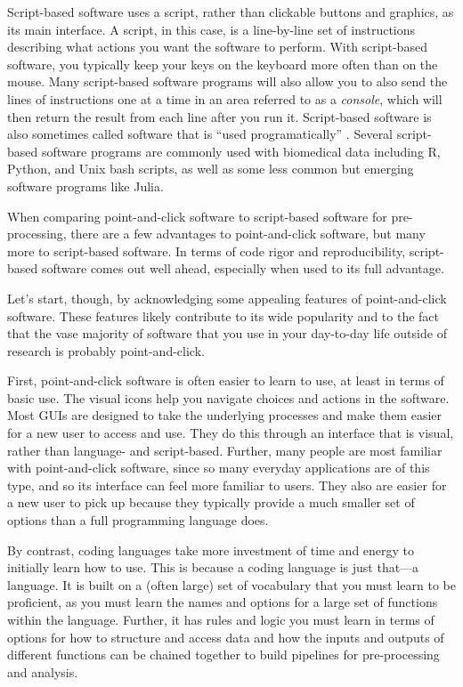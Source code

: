 \documentclass[]{tufte-book}
\begin{document}
Script-based software uses a script, rather than clickable buttons and graphics,
as its main interface. A script, in this case, is a line-by-line set of
instructions describing what actions you want the software to perform. With
script-based software, you typically keep your keys on the keyboard more often
than on the mouse. Many script-based software programs will also allow you to
also send the lines of instructions one at a time in an area referred to as a
\emph{console}, which will then return the result from each line after you run it.
Script-based software is also sometimes called software that is ``used
programatically'' \citep{perkel2018future}. Several script-based software programs are
commonly used with biomedical data including R, Python, and Unix bash scripts,
as well as some less common but emerging software programs like Julia.

When comparing point-and-click software to script-based software for
pre-processing, there are a few advantages to point-and-click software, but
many more to script-based software. In terms of code rigor and reproducibility,
script-based software comes out well ahead, especially when used to its
full advantage.

Let's start, though, by acknowledging some appealing features of point-and-click
software. These features likely contribute to its wide popularity and to the
fact that the vase majority of software that you use in your day-to-day life
outside of research is probably point-and-click.

First, point-and-click software is often easier to learn to use, at least in
terms of basic use. The visual icons help you navigate choices and actions in
the software. Most GUIs are designed to take the underlying processes and
make them easier for a new user to access and use. They do this through
an interface that is visual, rather than language- and script-based.
Further, many people are most familiar with point-and-click
software, since so many everyday applications are of this type, and so its
interface can feel more familiar to users.
They also are easier for a new user to pick up because they typically
provide a much smaller set of options than a full programming language does.

By contrast, coding languages take more investment of time and energy to
initially learn how to use. This is because a coding language is just that---a
language. It is built on a (often large) set of vocabulary that you must learn
to be proficient, as you must learn the names and options for a large set
of functions within the language. Further, it has rules and logic you must learn
in terms of options for how to structure and access data and how the inputs and
outputs of different functions can be chained together to build pipelines for
pre-processing and analysis.
\end{document}
